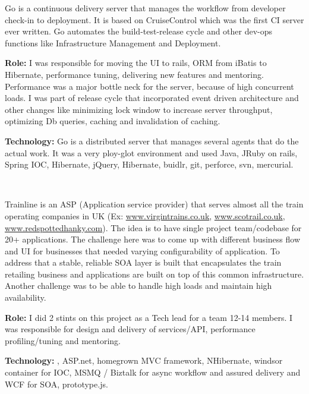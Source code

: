 \begin{resume}
\begin{position}
Go is a continuous delivery server that manages the workflow from developer check-in to deployment. It is based on CruiseControl which was the first CI server ever written. Go automates the build-test-release cycle and other dev-ops functions like Infrastructure Management and Deployment.

{\textbf{Role:}} I was responsible for moving the UI to rails, ORM from iBatis to Hibernate, performance tuning, delivering new features and mentoring. Performance was a major bottle neck for the server, because of high concurrent loads. I was part of release cycle that incorporated event driven architecture and other changes like minimizing lock window to increase server throughput, optimizing Db queries, caching and invalidation of caching. 

{\textbf{Technology:}} Go is a distributed server that manages several agents that do the actual work. It was a very ploy-glot environment and used Java, JRuby on rails, Spring IOC, Hibernate, jQuery, Hibernate, buidlr, git, perforce, svn, mercurial.
\end{position}\\


\begin{position}
Trainline is an ASP (Application service provider) that serves almost all the train operating companies in UK (Ex: \url{www.virgintrains.co.uk}, \url{www.scotrail.co.uk}, \url{www.redspottedhanky.com}). The idea is to have single project team/codebase for 20+ applications. The challenge here was to come up with different business flow and UI for businesses that needed varying configurability of application. To address that a stable, reliable SOA layer is built that encapsulates the train retailing business and applications are built on top of this common infrastructure. Another challenge was to be able to handle high loads and maintain high availability.

{\textbf{Role:}} I did 2 stints on this project as a Tech lead for a team 12-14 members. I was responsible for design and delivery of services/API, performance profiling/tuning and mentoring.

{\textbf{Technology:}} \CSharp, ASP.net, homegrown MVC framework, NHibernate,  windsor container for IOC, MSMQ / Biztalk for async workflow and assured delivery and WCF for SOA, prototype.js.
\end{position}\\



\end{resume}

